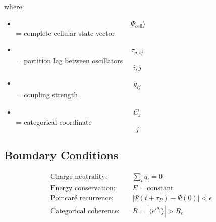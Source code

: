 \documentclass[11pt,twocolumn,a4paper]{article}
\theoremstyle{remark}
\begin{document}
where:
\begin{itemize}
\item $$|\Psi_{\mathrm{cell}}\rangle$$ = complete cellular state vector
\item $$\tau_{p,ij}$$ = partition lag between oscillators $$i,j$$
\item $$g_{ij}$$ = coupling strength
\item $$C_j$$ = categorical coordinate $$j$$
\end{itemize}

\subsection{Boundary Conditions}

\begin{align}
\text{Charge neutrality:} \quad & \sum_i q_i = 0 \\
\text{Energy conservation:} \quad & E = \text{constant} \\
\text{Poincaré recurrence:} \quad & |\Psi(t+\tau_P) - \Psi(0)| < \epsilon \\
\text{Categorical coherence:} \quad & R = |\langle e^{i\theta_j}\rangle| > R_c
\end{align}
\end{document}
